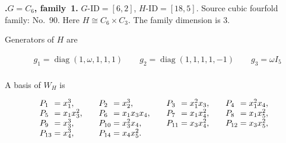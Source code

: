 \documentclass[12pt]{amsart}
\makeatletter
\numberwithin{equation}{section}
\theoremstyle{plain}
\theoremstyle{definition}
\theoremstyle{remark}
\DeclareMathOperator{\diag}{diag}
\newcommand{\PBasisLabel}[1]{\mathrlap{P_{#1}}\phantom{P_{99}}}
\newenvironment{SecEightAlignedBasis}[1]{%
  \begingroup\renewcommand{\arraystretch}{1.18}%
  \[\begin{array}{@{}#1@{}}%
}{\end{array}\]\endgroup}
\newenvironment{familydisplay}{%
  \begingroup
  \setlength{\arraycolsep}{1.35pt}%
  \renewcommand{\arraystretch}{0.96}%
  \setlength{\jot}{2pt}%
}{\endgroup}
\makeatother
\begin{document}
\par{}\medskip\noindent\textbf{.\enspace $G=C_6$, family~1.}\label{fam:threefold-no-20}
$G\text{-ID}=[6,2]$, $H\text{-ID}=[18,5]$.
Source cubic fourfold family: No.~90.  Here
$H\cong C_6\times C_3$.
The family dimension is $3$.
\par\smallskip\noindent Generators of $H$ are\par\nopagebreak
\begin{familydisplay}
\begin{align*}
&g_{1}=\diag(1,\omega,1,1,1)
\qquad g_{2}=\diag(1,1,1,1,-1)\qquad g_{3}=\omega I_5\\
\end{align*}
\end{familydisplay}
\par\smallskip\noindent A basis of $W_H$ is\par\nopagebreak
\begin{familydisplay}
\begin{SecEightAlignedBasis}{l@{\qquad}l@{\qquad}l@{\qquad}l}
\PBasisLabel{1}=x_{1}^{3}, & \PBasisLabel{2}=x_{2}^{3}, & \PBasisLabel{3}=x_{1}^{2}x_{3}, & \PBasisLabel{4}=x_{1}^{2}x_{4},\\
\PBasisLabel{5}=x_{1}x_{3}^{2}, & \PBasisLabel{6}=x_{1}x_{3}x_{4}, & \PBasisLabel{7}=x_{1}x_{4}^{2}, & \PBasisLabel{8}=x_{1}x_{5}^{2},\\
\PBasisLabel{9}=x_{3}^{3}, & \PBasisLabel{10}=x_{3}^{2}x_{4}, & \PBasisLabel{11}=x_{3}x_{4}^{2}, & \PBasisLabel{12}=x_{3}x_{5}^{2},\\
\PBasisLabel{13}=x_{4}^{3}, & \PBasisLabel{14}=x_{4}x_{5}^{2}.
\end{SecEightAlignedBasis}
\end{familydisplay}
\end{document}
